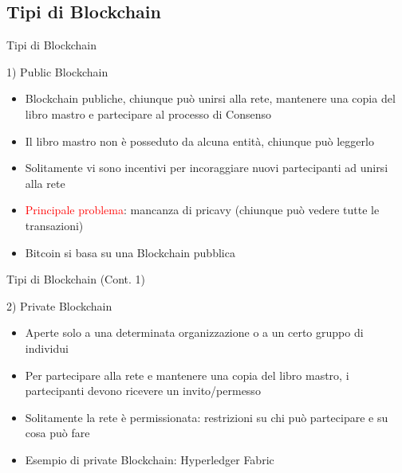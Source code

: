 \documentclass{beamer}
\newcommand\red[1]{\textcolor{red}{#1}}
\begin{document}
  \subsection{Tipi di Blockchain}
  \begin{frame}{Tipi di Blockchain}
    \begin{block}{1) Public Blockchain}
      \begin{itemize}
        \item Blockchain publiche, chiunque può unirsi alla rete, mantenere una copia del libro mastro e partecipare al processo di Consenso 
        \item Il libro mastro non è posseduto da alcuna entità, chiunque può leggerlo
        \item Solitamente vi sono incentivi per incoraggiare nuovi partecipanti ad unirsi alla rete \pause
        \item \red{Principale problema}: mancanza di pricavy (chiunque può vedere tutte le transazioni) \pause
        \item Bitcoin si basa su una Blockchain pubblica
      \end{itemize}
    \end{block}
  \end{frame}




  \begin{frame}{Tipi di Blockchain (Cont. 1)}
    \begin{block}{2) Private Blockchain}
      \begin{itemize}
        \item Aperte solo a una determinata organizzazione o a un certo gruppo di individui
        \item Per partecipare alla rete e mantenere una copia del libro mastro, i partecipanti devono ricevere un invito/permesso
        \item Solitamente la rete è permissionata: restrizioni su chi può partecipare e su cosa può fare
        \item Esempio di private Blockchain: Hyperledger Fabric \cite{hyperledger-fabric}
      \end{itemize}
    \end{block}
  \end{frame}
\end{document}

